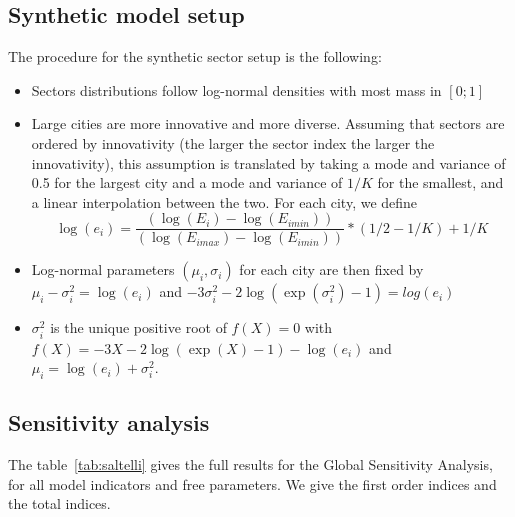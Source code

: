 \subsection*{Synthetic model setup}

The procedure for the synthetic sector setup is the following:
\begin{itemize}
    \item Sectors distributions follow log-normal densities with most mass in $\left[0;1\right]$
    \item Large cities are more innovative and more diverse. Assuming that sectors are ordered by innovativity (the larger the sector index the larger the innovativity), this assumption is translated by taking a mode and variance of 0.5 for the largest city and a mode and variance of $1/K$ for the smallest, and a linear interpolation between the two. For each city, we define
    \[
    \log(e_i) = \frac{(\log(E_i) - \log(E_{imin}))}{(\log(E_{imax}) - \log(E_{imin}))} * (1/2 - 1/K) + 1/K
    \]
    \item Log-normal parameters $(\mu_i,\sigma_i)$ for each city are then fixed by $\mu_i - \sigma_i^2 = \log(e_i)$ and $-3 \sigma_i^2 - 2 \log(\exp(\sigma_i^2) - 1) = log(e_i)$
    \item $\sigma_i^2$ is the unique positive root of $f(X)=0$ with $f(X) = -3X - 2 \log(\exp(X) - 1) - \log(e_i)$ and $\mu_i = \log(e_i) + \sigma_i^2$.
\end{itemize}






\subsection*{Sensitivity analysis}

The table~\ref{tab:saltelli} gives the full results for the Global Sensitivity Analysis, for all model indicators and free parameters. We give the first order indices and the total indices.

